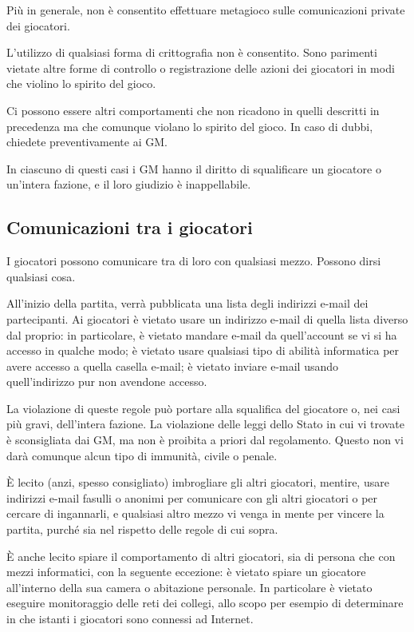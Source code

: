 \documentclass[a4paper,10pt]{article}
\begin{document}
Più in generale, non è consentito effettuare metagioco sulle comunicazioni private dei giocatori.

L'utilizzo di qualsiasi forma di crittografia non è consentito. Sono parimenti vietate altre forme di controllo o registrazione delle azioni dei giocatori in modi che violino lo spirito del gioco.

Ci possono essere altri comportamenti che non ricadono in quelli descritti in precedenza ma che comunque violano lo spirito del gioco. In caso di dubbi, chiedete preventivamente ai GM.

In ciascuno di questi casi i GM hanno il diritto di squalificare un giocatore o un'intera fazione, e il loro giudizio è inappellabile.

\subsection{Comunicazioni tra i giocatori}

I giocatori possono comunicare tra di loro con qualsiasi mezzo. Possono dirsi qualsiasi cosa.

All'inizio della partita, verrà pubblicata una lista degli indirizzi e-mail dei partecipanti. Ai giocatori è vietato usare un indirizzo e-mail di quella lista diverso dal proprio: in particolare, è vietato mandare e-mail da quell'account se vi si ha accesso in qualche modo; è vietato usare qualsiasi tipo di abilità informatica per avere accesso a quella casella e-mail; è vietato inviare e-mail usando quell'indirizzo pur non avendone accesso.

La violazione di queste regole può portare alla squalifica del giocatore o, nei casi più gravi, dell'intera fazione. La violazione delle leggi dello Stato in cui vi trovate è sconsigliata dai GM, ma non è proibita a priori dal regolamento. Questo non vi darà comunque alcun tipo di immunità, civile o penale.

È lecito (anzi, spesso consigliato) imbrogliare gli altri giocatori, mentire, usare indirizzi e-mail fasulli o anonimi per comunicare con gli altri giocatori o per cercare di ingannarli, e qualsiasi altro mezzo vi venga in mente per vincere la partita, purché sia nel rispetto delle regole di cui sopra.

È anche lecito spiare il comportamento di altri giocatori, sia di persona che con mezzi informatici, con la seguente eccezione: è vietato spiare un giocatore all'interno della sua camera o abitazione personale. In particolare è vietato eseguire monitoraggio delle reti dei collegi, allo scopo per esempio di determinare in che istanti i giocatori sono connessi ad Internet.
\end{document}
